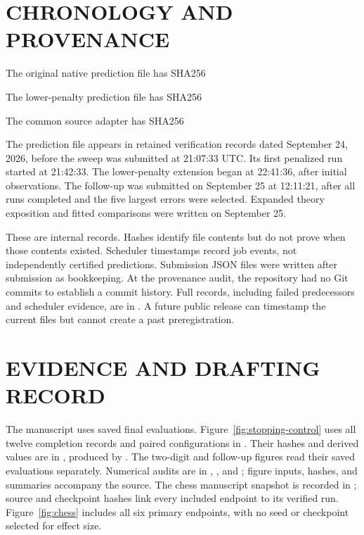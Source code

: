 \section{CHRONOLOGY AND PROVENANCE}\label{app:provenance}
The original native prediction file has SHA256
\begin{quote}\small{}\end{quote}
The lower-penalty prediction file has SHA256
\begin{quote}\small{}\end{quote}
The common source adapter has SHA256
\begin{quote}\small{}\end{quote}
The prediction file appears in retained verification records dated September 24, 2026, before the sweep was submitted at 21:07:33 UTC. Its first penalized run started at 21:42:33. The lower-penalty extension began at 22:41:36, after initial observations. The follow-up was submitted on September 25 at 12:11:21, after all runs completed and the five largest errors were selected. Expanded theory exposition and fitted comparisons were written on September 25.

These are internal records. Hashes identify file contents but do not prove when those contents existed. Scheduler timestamps record job events, not independently certified predictions. Submission JSON files were written after submission as bookkeeping. At the provenance audit, the repository had no Git commits to establish a commit history. Full records, including failed predecessors and scheduler evidence, are in . A future public release can timestamp the current files but cannot create a past preregistration.

\section{EVIDENCE AND DRAFTING RECORD}\label{app:evidence}
\begin{sloppypar}
The manuscript uses saved final evaluations. Figure~\ref{fig:stopping-control} uses all twelve completion records and paired configurations in . Their hashes and derived values are in , produced by . The two-digit and follow-up figures read their saved evaluations separately. Numerical audits are in , , and ; figure inputs, hashes, and summaries accompany the source. The chess manuscript snapshot is recorded in ; source and checkpoint hashes link every included endpoint to its verified run. Figure~\ref{fig:chess} includes all six primary endpoints, with no seed or checkpoint selected for effect size.
\end{sloppypar}


